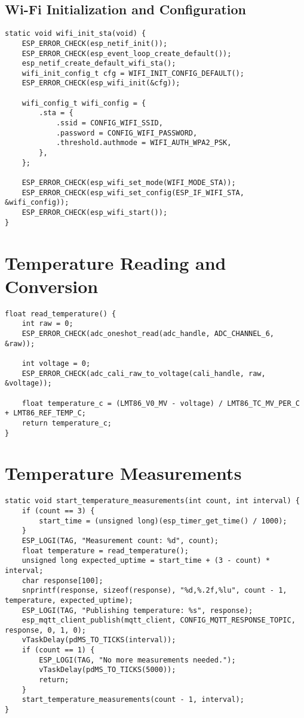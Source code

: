\documentclass[
  article,
  10pt,
  a4paper,
  oneside,
  openany,
  twocolumn
]{memoir}
\begin{document}
\subsection*{Wi-Fi Initialization and Configuration}
\begin{verbatim}
static void wifi_init_sta(void) {
    ESP_ERROR_CHECK(esp_netif_init());
    ESP_ERROR_CHECK(esp_event_loop_create_default());
    esp_netif_create_default_wifi_sta();
    wifi_init_config_t cfg = WIFI_INIT_CONFIG_DEFAULT();
    ESP_ERROR_CHECK(esp_wifi_init(&cfg));
    
    wifi_config_t wifi_config = {
        .sta = {
            .ssid = CONFIG_WIFI_SSID,
            .password = CONFIG_WIFI_PASSWORD,
            .threshold.authmode = WIFI_AUTH_WPA2_PSK,
        },
    };

    ESP_ERROR_CHECK(esp_wifi_set_mode(WIFI_MODE_STA));
    ESP_ERROR_CHECK(esp_wifi_set_config(ESP_IF_WIFI_STA, &wifi_config));
    ESP_ERROR_CHECK(esp_wifi_start());
}
\end{verbatim}

\section*{Temperature Reading and Conversion}

\begin{verbatim}
float read_temperature() {
    int raw = 0;
    ESP_ERROR_CHECK(adc_oneshot_read(adc_handle, ADC_CHANNEL_6, &raw));

    int voltage = 0;
    ESP_ERROR_CHECK(adc_cali_raw_to_voltage(cali_handle, raw, &voltage));

    float temperature_c = (LMT86_V0_MV - voltage) / LMT86_TC_MV_PER_C + LMT86_REF_TEMP_C;
    return temperature_c;
}
\end{verbatim}

\section*{Temperature Measurements}

\begin{verbatim}
static void start_temperature_measurements(int count, int interval) {
    if (count == 3) { 
        start_time = (unsigned long)(esp_timer_get_time() / 1000); 
    }
    ESP_LOGI(TAG, "Measurement count: %d", count);
    float temperature = read_temperature();
    unsigned long expected_uptime = start_time + (3 - count) * interval; 
    char response[100];
    snprintf(response, sizeof(response), "%d,%.2f,%lu", count - 1, temperature, expected_uptime);
    ESP_LOGI(TAG, "Publishing temperature: %s", response);
    esp_mqtt_client_publish(mqtt_client, CONFIG_MQTT_RESPONSE_TOPIC, response, 0, 1, 0);
    vTaskDelay(pdMS_TO_TICKS(interval));
    if (count == 1) {
        ESP_LOGI(TAG, "No more measurements needed.");
        vTaskDelay(pdMS_TO_TICKS(5000));
        return;
    }
    start_temperature_measurements(count - 1, interval);
}
\end{verbatim}
\end{document}
